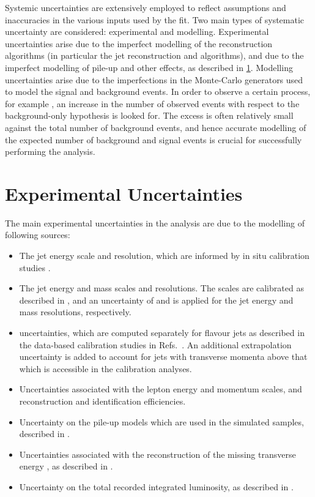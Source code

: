 Systemic uncertainties are extensively employed to reflect assumptions and inaccuracies in the various inputs used by the fit.
Two main types of systematic uncertainty are considered: experimental and modelling.
Experimental uncertainties arise due to the imperfect modelling of the reconstruction algorithms (in particular the jet reconstruction and \btagging algorithms), and due to the imperfect modelling of pile-up and other effects, as described in \cref{sec:experimental_uncertainties}.
Modelling uncertainties arise due to the imperfections in the Monte-Carlo generators used to model the signal and background events.
In order to observe a certain process, for example \VHbb, an increase in the number of observed events with respect to the background-only hypothesis is looked for.
The excess is often relatively small against the total number of background events, and hence accurate modelling of the expected number of background and signal events is crucial for successfully performing the analysis.


\section{Experimental Uncertainties}\label{sec:experimental_uncertainties}

The main experimental uncertainties in the analysis are due to the modelling of following sources:

\begin{itemize}
  \item The \smallR jet energy scale and resolution, which are informed by in situ calibration studies \cite{PERF-2016-04}.
  \item The \largeR jet energy and mass scales and resolutions. The scales are calibrated as described in , and an uncertainty of  and  is applied for the jet energy and mass resolutions, respectively.
  \item \btagging uncertainties, which are computed separately for \bcl flavour jets as described in the data-based calibration studies in Refs.~\cite{PERF-2016-05,ATLAS-CONF-2018-006,ATLAS-CONF-2018-001}. An additional extrapolation uncertainty is added to account for jets with transverse momenta above that which is accessible in the calibration analyses.
  \item Uncertainties associated with the lepton energy and momentum scales, and reconstruction and identification efficiencies.
  \item Uncertainty on the pile-up models which are used in the simulated samples, described in .
  \item Uncertainties associated with the reconstruction of the missing transverse energy \ETmiss, as described in .
  \item Uncertainty on the total recorded integrated luminosity, as described in .
\end{itemize}

